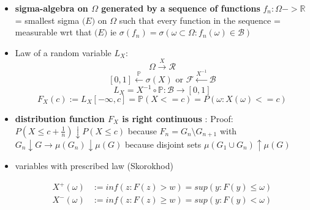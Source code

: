 \documentclass[10pt,landscape,a4paper]{article}
\begin{document}
\begin{multicols*}{3}
\begin{spacing}{0.5}
\begin{itemize}
\item  \textbf{sigma-algebra on $\Omega$ generated by a sequence of functions} $ f_n : \Omega -> \mathbb{R}$= smallest sigma $\mathcal(E)$ on $\Omega$ such that every function in the sequence = measurable wrt that $\mathcal(E)$  ie $\sigma(f_n) = \sigma( \omega \subset \Omega : f_n(\omega) \in \mathcal{B})$

\item  Law of a random variable $L_X$:  
$$ \Omega \xrightarrow{X} \mathcal{R}$$
$$ [0,1] \xleftarrow {\mathbb{P}} \sigma(X) \text{  or  } \mathcal{F} \xleftarrow {X^{-1}} \mathcal{B} $$
$$ L_X = X^{-1} \circ \mathbb{P} : \mathcal{B} \rightarrow [0,1] $$
$$ F_X(c) := L_X [-\infty,c] = \mathbb{P} (X <= c) = P (\omega : X(\omega) <= c) $$ 
\item \textbf{distribution function $F_X$ is right continuous} : Proof: $P(X \le c+ \frac{1}{n}) \downarrow P(X \le c )$ because $F_n = G_n \setminus G_{n+1}$ with $G_n \downarrow G \rightarrow \mu(G_n) \downarrow \mu(G)$ because disjoint sets $\mu(G_1 \cup G_n) \uparrow \mu(G)$
\item variables with prescribed law (Skorokhod)

\begin{equation}
\begin{split}
X^+(\omega) & := inf (z : F(z)>w) = sup (y : F(y) \le \omega)\\
X^-(\omega) & := inf (z : F(z) \ge w) = sup (y : F(y) < \omega)\\
\end{split}
\end{equation}
\end{itemize}

\pgfplotsset{compat=1.6}

 

\end{spacing}
\end{multicols*}
\end{document}
